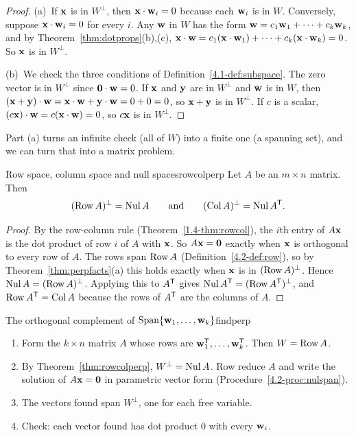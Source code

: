 \documentclass[11pt]{article}
\begin{document}
\begin{proof}
(a)~If $\mathbf{x}$ is in $W^{\perp}$, then $\mathbf{x}\cdot\mathbf{w}_i=0$ because each $\mathbf{w}_i$ is in $W$. Conversely, suppose $\mathbf{x}\cdot\mathbf{w}_i=0$ for every $i$. Any $\mathbf{w}$ in $W$ has the form $\mathbf{w}=c_1\mathbf{w}_1+\cdots+c_k\mathbf{w}_k$, and by Theorem~\ref{thm:dotprops}(b),(c), $\mathbf{x}\cdot\mathbf{w}=c_1(\mathbf{x}\cdot\mathbf{w}_1)+\cdots+c_k(\mathbf{x}\cdot\mathbf{w}_k)=0$. So $\mathbf{x}$ is in $W^{\perp}$.

(b)~We check the three conditions of Definition~\ref{4.1-def:subspace}. The zero vector is in $W^{\perp}$ since $\mathbf{0}\cdot\mathbf{w}=0$. If $\mathbf{x}$ and $\mathbf{y}$ are in $W^{\perp}$ and $\mathbf{w}$ is in $W$, then $(\mathbf{x}+\mathbf{y})\cdot\mathbf{w}=\mathbf{x}\cdot\mathbf{w}+\mathbf{y}\cdot\mathbf{w}=0+0=0$, so $\mathbf{x}+\mathbf{y}$ is in $W^{\perp}$. If $c$ is a scalar, $(c\mathbf{x})\cdot\mathbf{w}=c(\mathbf{x}\cdot\mathbf{w})=0$, so $c\mathbf{x}$ is in $W^{\perp}$.
\end{proof}

Part (a) turns an infinite check (all of $W$) into a finite one (a spanning set), and we can turn that into a matrix problem.

\begin{thm}{Row space, column space and null spaces}{rowcolperp}
Let $A$ be an $m\times n$ matrix. Then
\[
(\operatorname{Row} A)^{\perp}=\operatorname{Nul} A\qquad\text{and}\qquad(\operatorname{Col} A)^{\perp}=\operatorname{Nul} A^{\mathsf T} .
\]
\end{thm}

\begin{proof}
By the row-column rule (Theorem~\ref{1.4-thm:rowcol}), the $i$th entry of $A\mathbf{x}$ is the dot product of row $i$ of $A$ with $\mathbf{x}$. So $A\mathbf{x}=\mathbf{0}$ exactly when $\mathbf{x}$ is orthogonal to every row of $A$. The rows span $\operatorname{Row} A$ (Definition~\ref{4.2-def:row}), so by Theorem~\ref{thm:perpfacts}(a) this holds exactly when $\mathbf{x}$ is in $(\operatorname{Row} A)^{\perp}$. Hence $\operatorname{Nul} A=(\operatorname{Row} A)^{\perp}$. Applying this to $A^{\mathsf T}$ gives $\operatorname{Nul} A^{\mathsf T}=(\operatorname{Row} A^{\mathsf T})^{\perp}$, and $\operatorname{Row} A^{\mathsf T}=\operatorname{Col} A$ because the rows of $A^{\mathsf T}$ are the columns of $A$.
\end{proof}

\begin{proc}{The orthogonal complement of $\operatorname{Span}\{\mathbf{w}_1,\dots,\mathbf{w}_k\}$}{findperp}
\begin{enumerate}[nosep]
  \item Form the $k\times n$ matrix $A$ whose rows are $\mathbf{w}_1^{\mathsf T},\dots,\mathbf{w}_k^{\mathsf T}$. Then $W=\operatorname{Row} A$.
  \item By Theorem~\ref{thm:rowcolperp}, $W^{\perp}=\operatorname{Nul} A$. Row reduce $A$ and write the solution of $A\mathbf{x}=\mathbf{0}$ in parametric vector form (Procedure~\ref{4.2-proc:nulspan}).
  \item The vectors found span $W^{\perp}$, one for each free variable.
  \item Check: each vector found has dot product $0$ with every $\mathbf{w}_i$.
\end{enumerate}
\end{proc}
\end{document}
